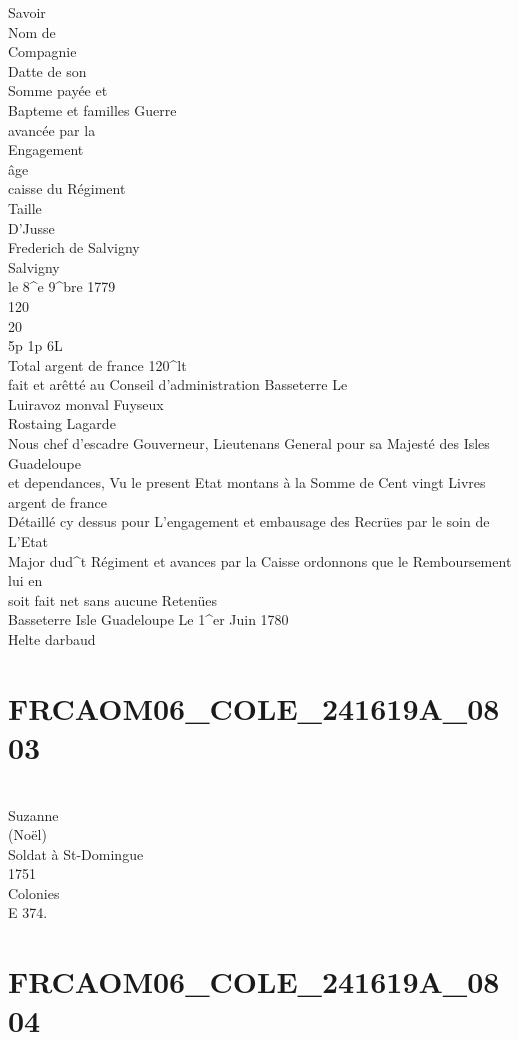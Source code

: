 \documentclass{article}
\begin{document}
\begin{pages}
Savoir
\pend\pstart
\\
Nom de\\
Compagnie\\
Datte de son\\
Somme payée et\\
Bapteme et familles Guerre\\
avancée par la\\
Engagement\\
âge\\
caisse du Régiment\\
Taille\\
D'Jusse\\
Frederich de Salvigny\\
Salvigny\\
le 8\^{}e 9\^{}bre 1779\\
120\\
20\\
5p 1p 6L\\
Total argent de france 120\^{}lt\\
fait et arêtté au Conseil d'administration Basseterre Le\\
Luiravoz monval Fuyseux\\
Rostaing Lagarde\\
Nous chef d'escadre Gouverneur, Lieutenans General pour sa Majesté des Isles Guadeloupe\\
et dependances, Vu le present Etat montans à la Somme de Cent vingt Livres argent de france\\
Détaillé cy dessus pour L'engagement et embausage des Recrües par le soin de L'Etat\\
Major dud\^{}t Régiment et avances par la Caisse ordonnons que le Remboursement lui en\\
soit fait net sans aucune Retenües\\
Basseterre Isle Guadeloupe Le 1\^{}er Juin 1780\\
Helte darbaud
\pend
\endnumbering\beginnumbering\section{FRCAOM06\_COLE\_241619A\_0803}\pstart
\\
Suzanne\\
(Noël)\\
Soldat à St-Domingue\\
1751\\
Colonies\\
E 374.
\pend
\endnumbering\beginnumbering\section{FRCAOM06\_COLE\_241619A\_0804}

\end{pages}
\end{document}
